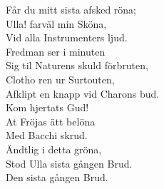 Får du mitt sista afsked röna;\\ 
Ulla! farväl min Sköna,\\ 
Vid alla Instrumenters ljud.\\ 
Fredman ser i minuten\\ 
Sig til Naturens skuld förbruten,\\ 
Clotho ren ur Surtouten,\\ 
Afklipt en knapp vid Charons bud.\\ 
Kom hjertats Gud!\\ 
At Fröjas ätt belöna\\ 
Med Bacchi skrud.\\ 
Ändtlig i detta gröna,\\ 
Stod Ulla sista gången Brud.\\ 
Den sista gången Brud.\\ 
